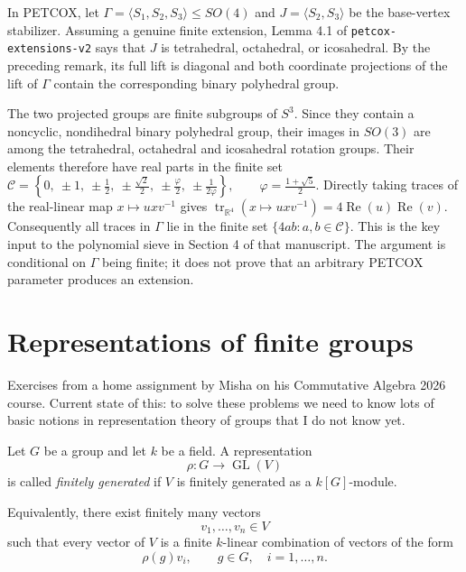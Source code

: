 \begin{remark}
\label{remark-petcox-quaternionic-trace}
In PETCOX, let
$\Gamma=\langle S_1,S_2,S_3\rangle
\leq SO(4)$ and
$J=\langle S_2,S_3\rangle$ be the
base-vertex stabilizer. Assuming a genuine
finite extension, Lemma 4.1 of
\texttt{petcox-extensions-v2} says that
$J$ is tetrahedral, octahedral, or
icosahedral. By the preceding remark,
its full lift is diagonal and both
coordinate projections of the lift of
$\Gamma$ contain the corresponding binary
polyhedral group.

The two projected groups are finite
subgroups of $S^3$. Since they contain a
noncyclic, nondihedral binary polyhedral
group, their images in $SO(3)$ are among
the tetrahedral, octahedral and
icosahedral rotation groups. Their
elements therefore have real parts in
the finite set
$
\mathcal C=
\left\{0,\ \pm1,\ \pm\frac12,\
\pm\frac{\sqrt2}{2},\
\pm\frac{\varphi}{2},\
\pm\frac{1}{2\varphi}\right\},
\qquad \varphi=\frac{1+\sqrt5}{2}.
$
Directly taking traces of the real-linear
map $x\mapsto uxv^{-1}$ gives
$
\operatorname{tr}_{\mathbb R^4}
(x\mapsto uxv^{-1})
=4\operatorname{Re}(u)\operatorname{Re}(v).
$
Consequently all traces in $\Gamma$ lie
in the finite set
$\{4ab:a,b\in\mathcal C\}$.
This is the key input to the polynomial
sieve in Section 4 of that manuscript.
The argument is conditional on
$\Gamma$ being finite; it does not prove
that an arbitrary PETCOX parameter
produces an extension.
\end{remark}

\section{Representations of finite groups}
\label{section-finite-group-reps}

\noindent
Exercises from a home assignment
by Misha on his Commutative Algebra
2026 course.
Current state of this:
to solve these problems
we need to know lots of basic
notions in representation theory
of groups that I do not know yet.

\begin{definition}
\label{definition-finitely-generated-rep}
Let $G$ be a group and let $k$ be a field.
A representation
$$
\rho:G\to \operatorname{GL}(V)
$$
is called {\it finitely generated} if $V$ is
finitely generated as a $k[G]$-module.

Equivalently, there exist finitely many
vectors
$$
v_1,\ldots,v_n\in V
$$
such that every vector of $V$ is a finite
$k$-linear combination of vectors of the form
$$
\rho(g)v_i,
\qquad g\in G,\quad i=1,\ldots,n.
$$
\end{definition}

